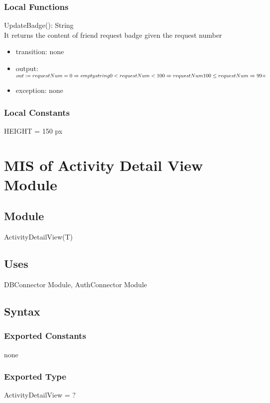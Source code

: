 \documentclass[12pt, titlepage]{article}
\begin{document}
\subsubsection{Local Functions}

\noindent UpdateBadge(): String\\
It returns the content of friend request badge given the request number
\begin{itemize}
\item transition: none
\item output: $out := requestNum = 0 \Rightarrow empty string \\ 0 < requestNum < 100 \Rightarrow requestNum\\ 100 \leq requestNum \Rightarrow 99+$
\item exception: none
\end{itemize}

\subsubsection{Local Constants}
HEIGHT = 150 px

\newpage

\section{MIS of Activity Detail View Module} \label{mADV}

\subsection{Module}

ActivityDetailView(T)

\subsection{Uses}

DBConnector Module,  AuthConnector Module

\subsection{Syntax}

\subsubsection{Exported Constants}
none
\subsubsection{Exported Type}
ActivityDetailView = ?
\end{document}
